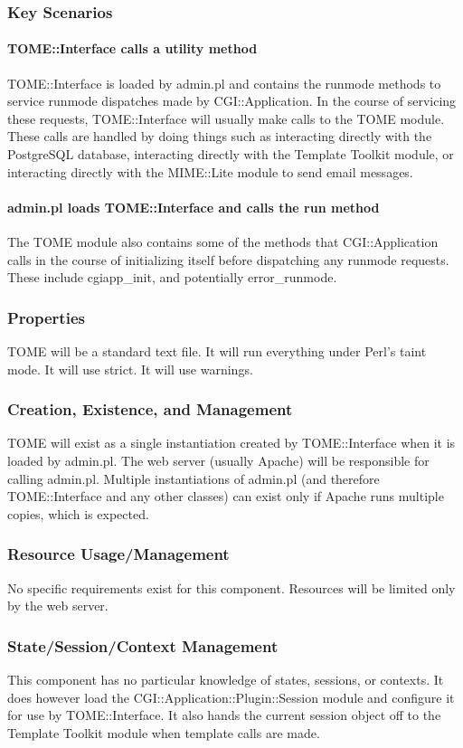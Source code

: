 \documentclass[12pt,titlepage]{article}
\begin{document}
\subsubsection{Key Scenarios}
\paragraph{TOME::Interface calls a utility method}
TOME::Interface is loaded by admin.pl and contains the runmode methods to service runmode dispatches made by CGI::Application.  In the course of servicing these requests, TOME::Interface will usually make calls to the TOME module.  These calls are handled by doing things such as interacting directly with the PostgreSQL database, interacting directly with the Template Toolkit module, or interacting directly with the MIME::Lite module to send email messages.
\paragraph{admin.pl loads TOME::Interface and calls the run method}
The TOME module also contains some of the methods that CGI::Application calls in the course of initializing itself before dispatching any runmode requests.  These include cgiapp\_init, and potentially error\_runmode.
\subsubsection{Properties}
TOME will be a standard text file.  It will run everything under Perl's taint mode.  It will use strict.  It will use warnings. 
\subsubsection{Creation, Existence, and Management}
TOME will exist as a single instantiation created by TOME::Interface when it is loaded by admin.pl.  The web server (usually Apache) will be responsible for calling admin.pl.  Multiple instantiations of admin.pl (and therefore TOME::Interface and any other classes) can exist only if Apache runs multiple copies, which is expected.
\subsubsection{Resource Usage/Management}
No specific requirements exist for this component.  Resources will be limited only by the web server.
\subsubsection{State/Session/Context Management}
This component has no particular knowledge of states, sessions, or contexts.  It does however load the CGI::Application::Plugin::Session module and configure it for use by TOME::Interface.  It also hands the current session object off to the Template Toolkit module when template calls are made.
\end{document}

